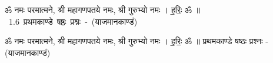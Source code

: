 \documentclass[17pt]{extarticle}
\begin{document}
\begin{titlepage}
    \begin{center}
 
\begin{sanskrit}
    { \Large
    ॐ नमः परमात्मने, श्री महागणपतये नमः, 
श्री गुरुभ्यो नमः । ह॒रिः॒ ॐ ॥ 
    }
    \\
    \vspace{2.5cm}
    \mbox{ \Huge
    1.6     प्रथमकाण्डे षष्ठः प्रश्नः - (याजमानकाण्डं)   }
\end{sanskrit}
\end{center}

\end{titlepage}
\tableofcontents

ॐ नमः परमात्मने, श्री महागणपतये नमः, 
श्री गुरुभ्यो नमः । ह॒रिः॒ ॐ ॥      प्रथमकाण्डे षष्ठः प्रश्नः - (याजमानकाण्डं) \newline

\end{document}
